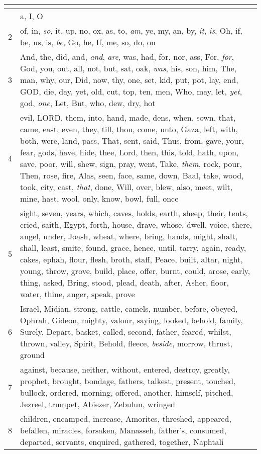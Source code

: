 \begin{center}
\begin{longtable}{l|p{3.75in}}
\hline \multicolumn{2}{c}{{ }} \\ \hline
\endfoot 
1 & a, I, O\\ \hline 
2 & of, in, \emph{so}, it, up, no, ox, as, to, \emph{am}, ye, my, an, by, \emph{it}, \emph{is}, Oh, if, be, us, is, \emph{be}, Go, he, If, me, so, do, on\\ \hline 
3 & And, the, did, and, \emph{and}, \emph{are}, was, had, for, nor, ass, For, \emph{for}, God, you, out, all, not, but, sat, oak, \emph{was}, his, son, him, The, man, why, our, Did, now, thy, one, set, kid, put, pot, lay, end, GOD, die, day, yet, old, cut, top, ten, men, Who, may, let, \emph{yet}, god, \emph{one}, Let, But, who, dew, dry, hot\\ \hline 
4 & evil, LORD, them, into, hand, made, dens, when, sown, that, came, east, even, they, till, thou, come, unto, Gaza, left, with, both, were, land, pass, That, sent, said, Thus, from, gave, your, fear, gods, have, hide, thee, Lord, then, this, told, hath, upon, save, poor, will, shew, sign, pray, went, Take, \emph{them}, rock, pour, Then, rose, fire, Alas, seen, face, same, down, Baal, take, wood, took, city, cast, \emph{that}, done, Will, over, blew, also, meet, wilt, mine, hast, wool, only, know, bowl, full, once\\ \hline 
5 & sight, seven, years, which, caves, holds, earth, sheep, their, tents, cried, saith, Egypt, forth, house, drave, whose, dwell, voice, there, angel, under, Joash, wheat, where, bring, hands, might, shalt, shall, least, smite, found, grace, hence, until, tarry, again, ready, cakes, ephah, flour, flesh, broth, staff, Peace, built, altar, night, young, throw, grove, build, place, offer, burnt, could, arose, early, thing, asked, Bring, stood, plead, death, after, Asher, floor, water, thine, anger, speak, prove\\ \hline 
6 & Israel, Midian, strong, cattle, camels, number, before, obeyed, Ophrah, Gideon, mighty, valour, saying, looked, behold, family, Surely, Depart, basket, called, second, father, feared, whilst, thrown, valley, Spirit, Behold, fleece, \emph{beside}, morrow, thrust, ground\\ \hline 
7 & against, because, neither, without, entered, destroy, greatly, prophet, brought, bondage, fathers, talkest, present, touched, bullock, ordered, morning, offered, another, himself, pitched, Jezreel, trumpet, Abiezer, Zebulun, wringed\\ \hline 
8 & children, encamped, increase, Amorites, threshed, appeared, befallen, miracles, forsaken, Manasseh, father's, consumed, departed, servants, enquired, gathered, together, Naphtali\\ \hline 

\end{longtable}
\end{center}
